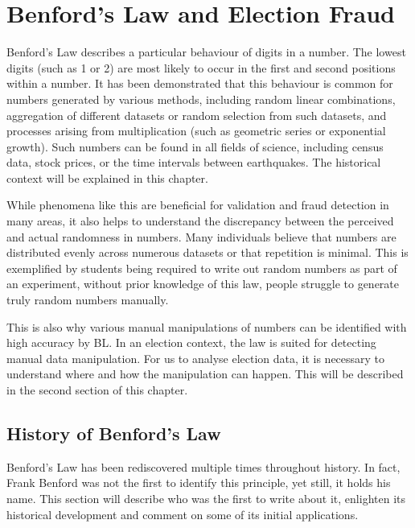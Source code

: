 \chapter{Benford’s Law and Election Fraud} %

Benford's Law describes a particular behaviour of digits in a number. The lowest digits (such as 1 or 2) are most likely to occur in the first and second positions within a number. It has been demonstrated that this behaviour is common for numbers generated by various methods, including random linear combinations, aggregation of different datasets or random selection from such datasets, and processes arising from multiplication (such as geometric series or exponential growth). Such numbers can be found in all fields of science, including census data, stock prices, or the time intervals between earthquakes. The historical context will be explained in this chapter. \cite{Hronova2023,kossovsky2014benford, Cerqueti2202} %

While phenomena like this are beneficial for validation and fraud detection in many areas, it also helps to understand the discrepancy between the perceived and actual randomness in numbers. Many individuals believe that numbers are distributed evenly across numerous datasets or that repetition is minimal. This is exemplified by students being required to write out random numbers as part of an experiment, without prior knowledge of this law, people struggle to generate truly random numbers manually. \cite{kossovsky2014benford, Beber2012} %

This is also why various manual manipulations of numbers can be identified with high accuracy by BL. In an election context, the law is suited for detecting manual data manipulation. For us to analyse election data, it is necessary to understand where and how the manipulation can happen. This will be described in the second section of this chapter. 

\section{History of Benford's Law}

Benford's Law has been rediscovered multiple times throughout history. In fact, Frank Benford was not the first to identify this principle, yet still, it holds his name. This section will describe who was the first to write about it, enlighten its historical development and comment on some of its initial applications.

